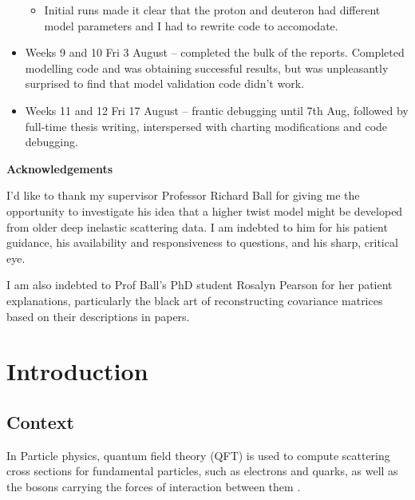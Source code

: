 \documentclass[12pt,a4paper]{report}
\begin{document}
\begin{itemize}
    \begin{itemize}
    \item Initial runs made it clear that the proton and deuteron had different model parameters and I had to rewrite code to accomodate.
    \end{itemize}
\item Weeks 9 and 10 Fri 3 August -- completed the bulk of the reports. Completed modelling code and was obtaining successful results, but was unpleasantly surprised to find that model validation code didn't work.
\item Weeks 11 and 12 Fri 17 August -- frantic debugging until 7th Aug, followed by full-time thesis writing, interspersed with charting modifications and code debugging.
\end{itemize}

\newpage

\begin{center}
\textbf{Acknowledgements}
\end{center}

I'd like to thank my supervisor Professor Richard Ball for giving me the opportunity to investigate his idea that a higher twist model might be developed from older deep inelastic scattering data. I am indebted to him for his patient guidance, his availability and responsiveness to questions, and his sharp, critical eye.

I am also indebted to Prof Ball's PhD student Rosalyn Pearson for her patient explanations, particularly the black art of reconstructing covariance matrices based on their descriptions in papers.



\tableofcontents \listoftables \listoffigures

\chapter{Introduction}

\section{Context}

In Particle physics, quantum field theory (QFT) is used to compute scattering cross sections for fundamental particles, such as electrons and quarks, as well as the bosons carrying the forces of interaction between them \cite{PeskinSchroeder}.
\end{document}
